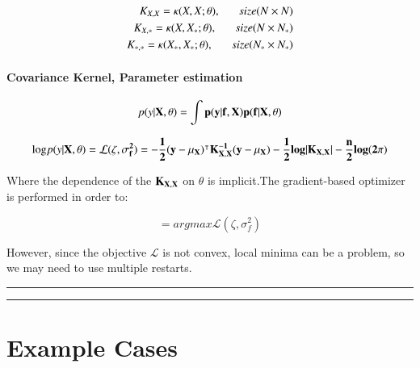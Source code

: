 \documentclass[]{elsarticle} %
\begin{document}
\begin{equation}
 \begin{split}
K_{X,X} = {\Large \kappa} (X,X; \theta) , \; \; \; \; \; \ size (N \times  N) \\
K_{X,\ast} = {\Large \kappa} (X,X_\ast; \theta), \; \; \; \; \; \ size (N \times N_*) \\
K_{\ast,\ast} = {\Large \kappa} (X_\ast, X_\ast; \theta), \; \; \; \; \; \ size(N_\ast \times N_\ast)
 \end{split}
\label{eq:cov_sign}
\end{equation}

\hypertarget{covariance-kernel-parameter-estimation}{%
\paragraph{Covariance Kernel, Parameter estimation}\label{covariance-kernel-parameter-estimation}}

\begin{equation}
p(y|\bf{X,\theta}) = \int p(y|\bf{f,X})p(f|\bf{X,\theta})
\label{eq:lig_int}
\end{equation}

\begin{equation}
\text{log} p(y|\bf{X,\theta})=\mathcal{L}(\zeta,\sigma_f^2)=-\frac{1}{2}(y-\mu_X)^{\intercal}\mathbf{K}_{X,X}^{-1}(y-\mu_X)-\frac{1}{2}log|K_{X,X}|-\frac{n}{2}log(2\pi)
\label{eq:log_like}
\end{equation}

Where the dependence of the \(\bf{K}_{X,X}\) on \(\theta\) is implicit.The gradient-based optimizer is performed in order to:

\begin{equation}
[\zeta^\ast, \sigma_f^{2\ast}]=argmax\mathcal{L}(\zeta,\sigma^2_f)
\label{eq:log_like_opt}
\end{equation}

However, since the objective \(\mathcal{L}\) is not convex, local minima can be a problem, so we may need to use multiple restarts.

\begin{center}\rule{0.5\linewidth}{0.5pt}\end{center}

\begin{center}\rule{0.5\linewidth}{0.5pt}\end{center}

\newpage

\hypertarget{example-cases}{%
\section{Example Cases}\label{example-cases}}
\end{document}
